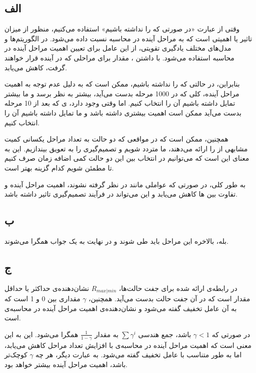 \subsection*{الف}

وقتی از عبارت «در صورتی که  را نداشته باشیم» استفاده می‌کنیم، منظور از 
میزان تاثیر یا اهمیتی است که به مراحل آینده در محاسبه 
نسبت داده می‌شود. در الگوریتم‌ها و مدل‌های مختلف یادگیری تقویتی، از این عامل برای تعیین اهمیت مراحل آینده در محاسبه 
استفاده می‌شود. با داشتن 
، مقدار 
 برای مراحلی که در آینده قرار خواهند گرفت، کاهش می‌یابد.

بنابراین، در حالتی که 
را نداشته باشیم، ممکن است که به دلیل عدم توجه به اهمیت مراحل آینده، 
کلی که در 1000 مرحله بدست می‌آید، بیشتر به نظر برسد و ما بیشتر تمایل داشته باشیم آن را انتخاب کنیم. اما وقتی 
وجود دارد، 
ی که بعد از 10 مرحله بدست می‌آید ممکن است اهمیت بیشتری داشته باشد و ما تمایل داشته باشیم آن را انتخاب کنیم.

همچنین، ممکن است که در مواقعی که دو حالت به تعداد مراحل یکسانی کمیت مشابهی از 
را ارائه می‌دهند، ما متردد شویم و تصمیم‌گیری را به تعویق بیندازیم. این به معنای این است که می‌توانیم در انتخاب بین این دو حالت کمی اضافه زمان صرف کنیم تا مطمئن شویم کدام گزینه بهتر است.

به طور کلی، در صورتی که عواملی مانند 
در نظر گرفته نشوند، اهمیت مراحل آینده و تفاوت بین 
ها کاهش می‌یابد و این می‌تواند در فرآیند تصمیم‌گیری تاثیر داشته باشد.

\subsection*{ب}

بله، بالاخره این مراحل باید طی شوند و در نهایت به یک جواب همگرا می‌شوند.

\subsection*{ج}

در رابطه‌ی ارائه شده برای جفت حالت‌ها، 
$R_{max|min}$
نشان‌دهنده‌ی حداکثر یا حداقل مقدار
است که در آن جفت حالت بدست می‌آید. همچنین،
$\gamma$
مقداری بین 0 و 1 است که به آن عامل تخفیف گفته می‌شود و نشان‌دهنده‌ی اهمیت مراحل آینده در محاسبه‌ی
است.

در صورتی که
$\gamma < 1$
باشد، جمع هندسی 
$\sum \gamma^i$
به مقدار 
$\frac{1}{1-\gamma}$
همگرا می‌شود. این به این معنی است که اهمیت مراحل آینده در محاسبه‌ی
با افزایش تعداد مراحل کاهش می‌یابد، اما به طور متناسب با عامل تخفیف گفته می‌شود. به عبارت دیگر، هر چه 
$\gamma$
کوچک‌تر باشد، اهمیت مراحل آینده بیشتر خواهد بود.

